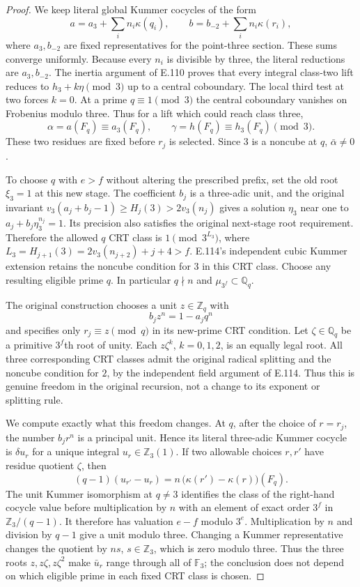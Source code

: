 \begin{proof}
We keep literal global Kummer cocycles of the form
\[
 a=a_3+\sum_i n_i\kappa(q_i),\qquad
 b=b_{-2}+\sum_i n_i\kappa(r_i),
\]
where $a_3,b_{-2}$ are fixed representatives for the point-three
section. These sums converge uniformly. Because every $n_i$ is
divisible by three, the literal reductions are $a_3,b_{-2}$.
The inertia argument of E.110 proves that every integral class-two
lift reduces to $h_3+k\eta\pmod3$ up to a central coboundary.
The local third test at two forces $k=0$. At a prime $q\equiv1\pmod3$
the central coboundary vanishes on Frobenius modulo three. Thus
for a lift which could reach class three,
\[
 \alpha=a(F_q)\equiv a_3(F_q),\qquad
 \gamma=h(F_q)\equiv h_3(F_q)\pmod3.
\]
These two residues are fixed before $r_j$ is selected. Since $3$
is a noncube at $q$, $\bar\alpha\ne0$.

To choose $q$ with $e>f$ without altering the prescribed prefix,
set the old root $\xi_3=1$ at this new stage. The coefficient
$b_j$ is a three-adic unit, and the original invariant
$v_3(a_j+b_j-1)\ge H_j(3)>2v_3(n_j)$ gives a solution
$\eta_3$ near one to
$a_j+b_j\eta_3^{n_j}=1$. Its precision also satisfies the original
next-stage root requirement. Therefore the allowed $q$ CRT class
is $1\pmod{3^{L_3}}$, where
$L_3=H_{j+1}(3)=2v_3(n_{j+2})+j+4>f$.
E.114's independent cubic Kummer extension retains the noncube
condition for $3$ in this CRT class. Choose any resulting eligible
prime $q$. In particular $q\nmid n$ and $\mu_{3^f}\subset\mathbb Q_q$.

The original construction chooses a unit $z\in\mathbb Z_q$ with
\[
 b_j z^n=1-a_jq^n
\]
and specifies only $r_j\equiv z\pmod q$ in its new-prime CRT
condition. Let $\zeta\in\mathbb Q_q$ be a primitive $3^f$th root
of unity. Each $z\zeta^k$, $k=0,1,2$, is an equally legal root.
All three corresponding CRT classes admit the original radical
splitting and the noncube condition for $2$, by the independent
field argument of E.114. Thus this is genuine freedom in the
original recursion, not a change to its exponent or splitting rule.

We compute exactly what this freedom changes. At $q$, after the
choice of $r=r_j$, the number $b_jr^n$ is a principal unit. Hence
its literal three-adic Kummer cocycle is $\delta u_r$ for a unique
integral $u_r\in\mathbb Z_3(1)$. If two allowable choices $r,r'$
have residue quotient $\zeta$, then
\[
 (q-1)(u_{r'}-u_r)
       =n\,\bigl(\kappa(r')-\kappa(r)\bigr)(F_q).
\]
The unit Kummer isomorphism at $q\ne3$ identifies the class of
the right-hand cocycle value before multiplication by $n$ with
an element of exact order $3^f$ in $\mathbb Z_3/(q-1)$.
It therefore has valuation $e-f$ modulo $3^e$.
Multiplication by $n$ and division by $q-1$ give a unit modulo
three. Changing a Kummer representative changes the quotient
by $ns$, $s\in\mathbb Z_3$, which is zero modulo three.
Thus the three roots $z,z\zeta,z\zeta^2$ make $\bar u_r$
range through all of $\mathbb F_3$; the conclusion does not depend
on which eligible prime in each fixed CRT class is chosen.


\end{proof}
